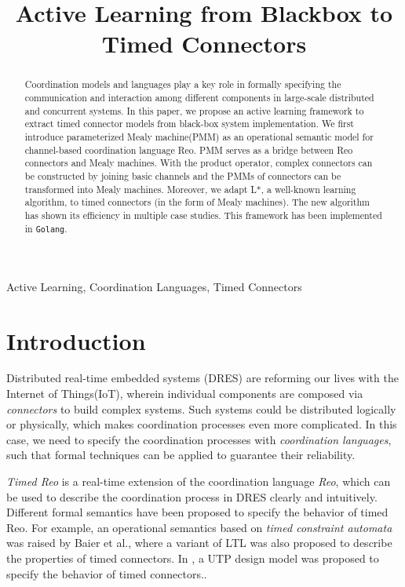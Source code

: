 \documentclass[conference, a4paper]{IEEEtran}
\title{Active Learning from Blackbox to Timed Connectors}
\author{
\IEEEauthorblockN{Yi Li, Meng Sun and Yiwu Wang}
\IEEEauthorblockA{
LMAM \& Department of Informatics, School of Mathematical Sciences, Peking University,
Beijing, China\\
liyi\_math@pku.edu.cn, summeng@math.pku.edu.cn, yiwuwang@126.com
}
}
\begin{document}
\maketitle 
\begin{abstract}
  Coordination models and languages play a key role in formally specifying the communication and
  interaction among different components in large-scale distributed and concurrent systems. In this
  paper, we propose an active learning framework to extract timed connector models from black-box
  system implementation. 
  We first introduce parameterized Mealy machine(PMM) as an operational semantic
  model for channel-based coordination language Reo. PMM serves as a bridge
  between Reo connectors and Mealy machines. With the product operator, complex connectors can be
  constructed by joining basic channels and the PMMs of connectors can be transformed into Mealy
  machines. Moreover, we adapt L*, a well-known learning algorithm, to timed connectors (in the form
  of Mealy machines). The new algorithm has shown its efficiency in multiple case studies. 
  This framework has been implemented in \texttt{Golang}.
\end{abstract}

\begin{IEEEkeywords}
  Active Learning, Coordination Languages, Timed Connectors
\end{IEEEkeywords}

\section{Introduction} 

Distributed real-time embedded systems (DRES) are reforming our lives with the
Internet of Things(IoT), wherein individual components are composed via \emph{connectors} 
to build complex systems. Such systems could be distributed logically or physically, which
makes coordination processes even more complicated. In this case, we need to specify the coordination
processes with \emph{coordination languages}, such that formal techniques can be applied to
guarantee their reliability.

\emph{Timed Reo} is a real-time extension of the coordination language \emph{Reo}, which can be used
to describe the coordination process in DRES clearly and intuitively. Different formal
semantics have been proposed to specify the behavior of timed Reo.
For example, an operational semantics based on \emph{timed constraint automata} was raised by Baier et
al.\cite{DBLP:conf/sefm/ArbabBBR04}, where a variant of LTL was also proposed to describe the
properties of timed connectors.
In \cite{DBLP:conf/tase/Meng12}, a UTP design model was proposed to specify the behavior of timed
connectors.. 
\end{document}
